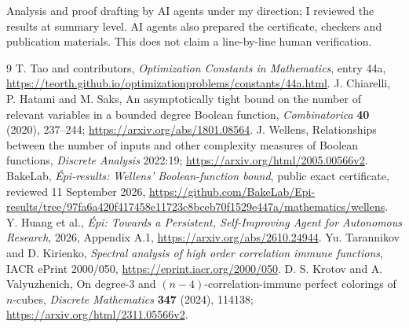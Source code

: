 \documentclass[11pt]{amsart}
\begin{document}
Analysis and proof drafting by AI agents under my direction; I reviewed
the results at summary level. AI agents also prepared the certificate,
checkers and publication materials. This does not claim a line-by-line
human verification.

\begin{thebibliography}{9}
 T. Tao and contributors, \emph{Optimization Constants in
Mathematics}, entry 44a,
\url{https://teorth.github.io/optimizationproblems/constants/44a.html}.
 J. Chiarelli, P. Hatami and M. Saks,
An asymptotically tight bound on the number of relevant variables in a
bounded degree Boolean function, \emph{Combinatorica} \textbf{40} (2020),
237--244; \url{https://arxiv.org/abs/1801.08564}.
 J. Wellens, Relationships between the number of inputs
and other complexity measures of Boolean functions,
\emph{Discrete Analysis} 2022:19;
\url{https://arxiv.org/html/2005.00566v2}.
 BakeLab, \emph{\'Epi-results: Wellens' Boolean-function bound},
public exact certificate, reviewed 11 September 2026,
\url{https://github.com/BakeLab/Epi-results/tree/97fa6a420f417458e11723c8bceb70f1529e447a/mathematics/wellens}.
 Y. Huang et al., \emph{\'Epi: Towards a Persistent,
Self-Improving Agent for Autonomous Research}, 2026, Appendix A.1,
\url{https://arxiv.org/abs/2610.24944}.
 Yu. Tarannikov and D. Kirienko, \emph{Spectral analysis of
high order correlation immune functions}, IACR ePrint 2000/050,
\url{https://eprint.iacr.org/2000/050}.
 D. S. Krotov and A. Valyuzhenich,
On degree-3 and $(n-4)$-correlation-immune perfect colorings of $n$-cubes,
\emph{Discrete Mathematics} \textbf{347} (2024), 114138;
\url{https://arxiv.org/html/2311.05566v2}.
\end{thebibliography}
\end{document}
